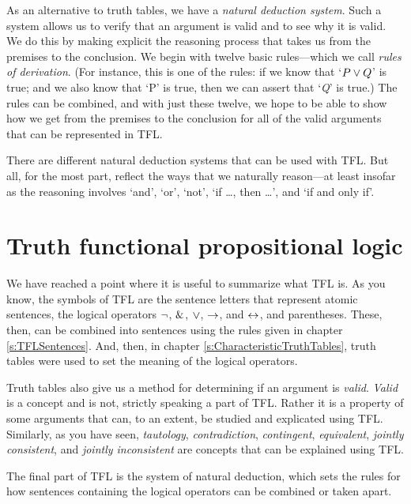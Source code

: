 As an alternative to truth tables, we have a \textit{natural deduction system}. Such a system allows us to verify that an argument is valid and to see why it is valid. We do this by making explicit the reasoning process that takes us from the premises to the conclusion. We begin with twelve basic rules---which we call \textit{rules of derivation}. (For instance, this is one of the rules: if we know that `$P \vee Q$' is true; and we also know that `\enot P' is true, then we can assert that `\textit{Q}' is true.) The rules can be combined, and with just these twelve, we hope to be able to show how we get from the premises to the conclusion for all of the valid arguments that can be represented in TFL. 

There are different natural deduction systems that can be used with TFL. But all, for the most part, reflect the ways that we naturally reason---at least insofar as the reasoning involves ‘and’, ‘or’, ‘not’, ‘if \ldots, then \ldots’, and ‘if and only if’. 


\section{Truth functional propositional logic}

We have reached a point where it is useful to summarize what TFL is. As you know, the symbols of TFL are the sentence letters that represent atomic sentences, the logical operators ${\neg}$, $\mathbin{\&}$, $\vee$, $\rightarrow$, and $\leftrightarrow$, and parentheses. These, then, can be combined into sentences using the rules given in chapter \ref{s:TFLSentences}. And, then, in chapter \ref{s:CharacteristicTruthTables}, truth tables were used to set the meaning of the logical operators. 

Truth tables also give us a method for determining if an argument is \textit{valid}. \textit{Valid} is a concept and is not, strictly speaking a part of TFL. Rather it is a property of some arguments that can, to an extent, be studied and explicated using TFL. Similarly, as you have seen, \textit{tautology}, \textit{contradiction}, \textit{contingent}, \textit{equivalent},  \textit{jointly consistent}, and \textit{jointly inconsistent} are concepts that can be explained using TFL.

The final part of TFL is the system of natural deduction, which sets the rules for how sentences containing the logical operators can be combined or taken apart. 

